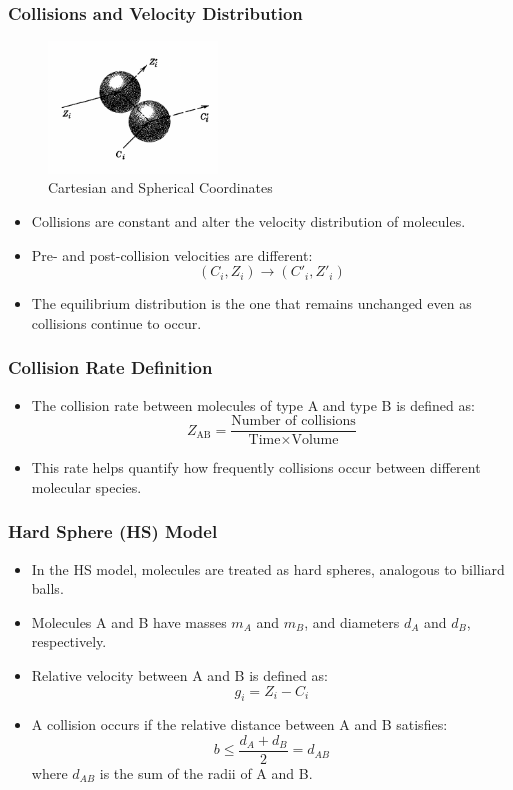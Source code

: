 \documentclass{beamer}
\begin{document}
\begin{frame}
\frametitle{Collisions and Velocity Distribution}
\begin{figure}
        \centering
        \includegraphics[width=0.4\textwidth]{collisions.png}
        \caption{Cartesian and Spherical Coordinates}
    \end{figure}
\begin{itemize}
    \item Collisions are constant and alter the velocity distribution of molecules.
    \item Pre- and post-collision velocities are different:
    \[
    (C_i, Z_i) \longrightarrow (C'_i, Z'_i)
    \]
    \item The equilibrium distribution is the one that remains unchanged even as collisions continue to occur.
\end{itemize}
\end{frame}

\begin{frame}
\frametitle{Collision Rate Definition}
\begin{itemize}
    \item The collision rate between molecules of type A and type B is defined as:
    \[
    Z_{\text{AB}} = \frac{\text{Number of collisions}}{\text{Time} \times \text{Volume}}
    \]
    \item This rate helps quantify how frequently collisions occur between different molecular species.
\end{itemize}
\end{frame}

\begin{frame}
\frametitle{Hard Sphere (HS) Model}
\begin{itemize}
    \item In the HS model, molecules are treated as hard spheres, analogous to billiard balls.
    \item Molecules A and B have masses $m_A$ and $m_B$, and diameters $d_A$ and $d_B$, respectively.
    \item Relative velocity between A and B is defined as:
    \[
    g_i = Z_i - C_i
    \]
    \item A collision occurs if the relative distance between A and B satisfies:
    \[
    b \leq \frac{d_A + d_B}{2} = d_{AB}
    \]
    where $d_{AB}$ is the sum of the radii of A and B.
\end{itemize}
\end{frame}
\end{document}
